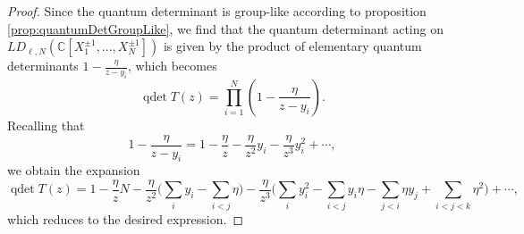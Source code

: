 \documentclass[11pt]{report}
\theoremstyle{definition}
\theoremstyle{remark}
\theoremstyle{remark}
\newcommand{\C}{\mathbb{C}}
\begin{document}
\begin{proof}
Since the quantum determinant is group-like according to proposition \ref{prop:quantumDetGroupLike}, we find that the quantum determinant acting on $LD_{\ell,N}(\C[X_1^{\pm 1},...,X_N^{\pm 1}])$ is given by the product of elementary quantum determinants $1-\frac{\eta}{z-y_i}$, which becomes
\begin{equation*}
\operatorname{qdet} T(z) = \prod_{i=1}^N \left( 1 - \frac{\eta}{z-y_i} \right).
\end{equation*}
Recalling that
\begin{equation*}
1- \frac{\eta}{z-y_i} = 1 - \frac{\eta}{z} - \frac{\eta}{z^2} y_i - \frac{\eta}{z^3} y_i^2 + \cdots,
\end{equation*}
we obtain the expansion
\begin{equation*}
\operatorname{qdet} T(z) = 1 - \frac{\eta}{z} N - \frac{\eta}{z^2} \bigg( \sum_i y_i - \sum_{i < j} \eta \bigg)
- \frac{\eta}{z^3} \bigg( \sum_i y_i^2 - \sum_{i < j} y_i \eta - \sum_{j < i} \eta y_j + \sum_{i < j < k} \eta^2 \bigg) + \cdots,
\end{equation*}
which reduces to the desired expression.
%

\end{proof}
\end{document}
